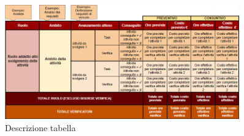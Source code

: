 \vspace{0.5cm}

\begin{figure}[H]
    \centering
    \includegraphics[width=0.9\textwidth]{../Images/spiegazioneTabella.png}
    \caption{Descrizione tabella} 
    \label{fig:spiegazioneTabella} 
\end{figure}